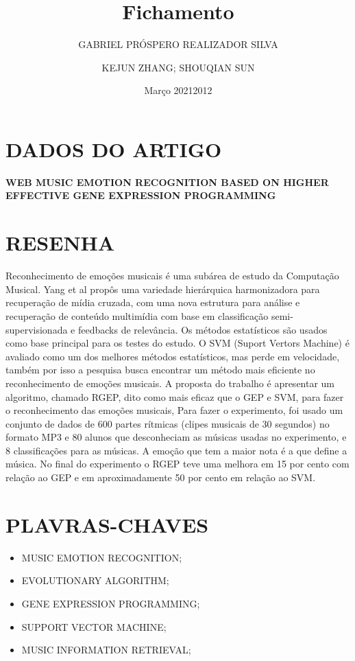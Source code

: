 \documentclass{article}
\title{Fichamento}
\author{GABRIEL PRÓSPERO REALIZADOR  SILVA}
\date{Março 2021}
\begin{document}
\maketitle

\section{DADOS DO ARTIGO}
\textbf{WEB MUSIC EMOTION RECOGNITION BASED ON HIGHER EFFECTIVE GENE EXPRESSION PROGRAMMING \\}
\author{KEJUN ZHANG; SHOUQIAN SUN \\}
\date{2012}

\section{RESENHA}
Reconhecimento de emoções musicais é uma subárea de estudo da Computação Musical. Yang et al propôs uma variedade hierárquica harmonizadora para recuperação de mídia cruzada, com uma nova estrutura para análise e recuperação de conteúdo multimídia com base em classificação semi-supervisionada e feedbacks de relevância. Os métodos estatísticos são usados como base principal para os testes do estudo. O SVM (Suport Vertors Machine) é avaliado como um dos melhores métodos estatísticos, mas perde em velocidade, também por isso a pesquisa busca encontrar um método mais eficiente no reconhecimento de emoções musicais. A proposta do trabalho é apresentar um algoritmo, chamado RGEP, dito como mais eficaz que o GEP e SVM, para fazer o reconhecimento das emoções musicais, Para fazer o experimento, foi usado um conjunto de dados de 600 partes rítmicas (clipes musicais de 30 segundos) no formato MP3 e 80 alunos que desconheciam as músicas usadas no experimento, e 8 classificações para as músicas. A emoção que tem a maior nota é a que define a música. No final do experimento o RGEP teve uma melhora em 15 por cento com relação ao GEP e em aproximadamente 50 por cento em relação ao SVM.

\section{PLAVRAS-CHAVES}
\begin{itemize}
    \item MUSIC EMOTION RECOGNITION; 
    \item EVOLUTIONARY ALGORITHM; 
    \item GENE EXPRESSION PROGRAMMING; 
    \item SUPPORT VECTOR MACHINE; 
    \item MUSIC INFORMATION RETRIEVAL;
\end{itemize}
\end{document}
